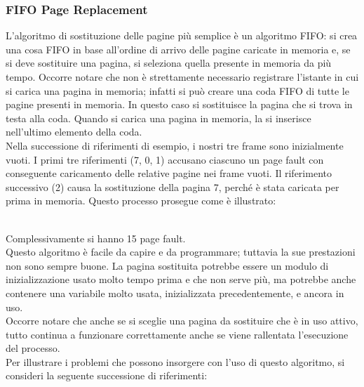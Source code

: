 \documentclass{article}
\begin{document}
			\subsubsection{FIFO Page Replacement}
				L’algoritmo di sostituzione delle pagine più semplice è un algoritmo FIFO: si crea una cosa FIFO in base all'ordine di arrivo delle pagine caricate in memoria e, se si deve sostituire una pagina, si seleziona quella presente in memoria da più tempo. Occorre notare che non è strettamente necessario registrare l’istante in cui si carica una pagina in memoria; infatti si può creare una coda FIFO di tutte le pagine presenti in memoria. In questo caso si sostituisce la pagina che si trova in testa alla coda. Quando si carica una pagina in memoria, la si inserisce nell’ultimo elemento della coda.
				\\Nella successione di riferimenti di esempio, i nostri tre frame sono inizialmente vuoti. I primi tre riferimenti (7, 0, 1) accusano ciascuno un page fault con conseguente caricamento delle relative pagine nei frame vuoti. Il riferimento successivo (2) causa la sostituzione della pagina 7, perché è stata caricata per prima in memoria. Questo processo prosegue come è illustrato:
				\begin{figure}[ht!]
				\end{figure}
				\\Complessivamente si hanno 15 page fault.
				\\Questo algoritmo è facile da capire e da programmare; tuttavia la sue prestazioni non sono sempre buone. La pagina sostituita potrebbe essere un modulo di inizializzazione usato molto tempo prima e che non serve più, ma potrebbe anche contenere una variabile molto usata, inizializzata precedentemente, e ancora in uso.
				\\Occorre notare che anche se si sceglie una pagina da sostituire che è in uso attivo, tutto continua a funzionare correttamente anche se viene rallentata l'esecuzione del processo.
				\\Per illustrare i problemi che possono insorgere con l’uso di questo algoritmo, si consideri la seguente successione di riferimenti:
\end{document}
